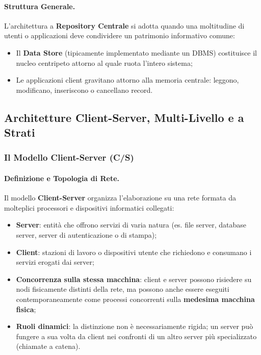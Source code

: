 \documentclass[12pt]{extarticle}
\begin{document}
\paragraph{Struttura Generale.}
L'architettura a \textbf{Repository Centrale} si adotta quando una moltitudine di utenti o applicazioni deve condividere un patrimonio informativo comune:
\begin{itemize}
    \item Il \textbf{Data Store} (tipicamente implementato mediante un DBMS) costituisce il nucleo centripeto attorno al quale ruota l'intero sistema;
    \item Le applicazioni client gravitano attorno alla memoria centrale: leggono, modificano, inseriscono o cancellano record.
\end{itemize}

\subsection{Architetture Client-Server, Multi-Livello e a Strati}
\subsubsection{Il Modello Client-Server (C/S)}

\paragraph{Definizione e Topologia di Rete.}
Il modello \textbf{Client-Server} organizza l'elaborazione su una rete formata da molteplici processori e dispositivi informatici collegati:
\begin{itemize}
    \item \textbf{Server}: entità che offrono servizi di varia natura (es. file server, database server, server di autenticazione o di stampa);
    \item \textbf{Client}: stazioni di lavoro o dispositivi utente che richiedono e consumano i servizi erogati dai server;
    \item \textbf{Concorrenza sulla stessa macchina}: client e server possono risiedere su nodi fisicamente distinti della rete, ma possono anche essere eseguiti contemporaneamente come processi concorrenti sulla \textbf{medesima macchina fisica};
    \item \textbf{Ruoli dinamici}: la distinzione non è necessariamente rigida; un server può fungere a sua volta da client nei confronti di un altro server più specializzato (chiamate a catena).
\end{itemize}
\end{document}
